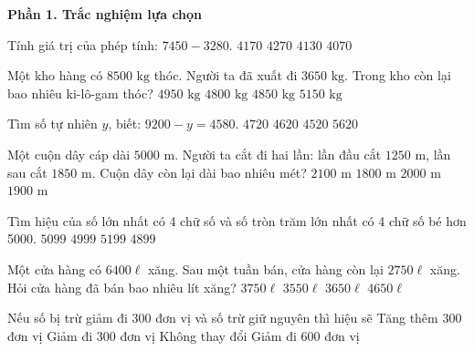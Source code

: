 \textbf{Phần 1. Trắc nghiệm lựa chọn}

\begin{ex} %
Tính giá trị của phép tính: $7450 - 3280$.
\choice
{\True $4170$}
{$4270$}
{$4130$}
{$4070$}
\end{ex}

\begin{ex} %
Một kho hàng có $8500\text{ kg}$ thóc. Người ta đã xuất đi $3650\text{ kg}$. Trong kho còn lại bao nhiêu ki-lô-gam thóc?
\choice
{$4950\text{ kg}$}
{$4800\text{ kg}$}
{\True $4850\text{ kg}$}
{$5150\text{ kg}$}
\end{ex}

\begin{ex} %
Tìm số tự nhiên $y$, biết: $9200 - y = 4580$.
\choice
{$4720$}
{\True $4620$}
{$4520$}
{$5620$}
\end{ex}

\begin{ex} %
Một cuộn dây cáp dài $5000\text{ m}$. Người ta cắt đi hai lần: lần đầu cắt $1250\text{ m}$, lần sau cắt $1850\text{ m}$. Cuộn dây còn lại dài bao nhiêu mét?
\choice
{$2100\text{ m}$}
{$1800\text{ m}$}
{$2000\text{ m}$}
{\True $1900\text{ m}$}
\end{ex}

\begin{ex} %
Tìm hiệu của số lớn nhất có 4 chữ số và số tròn trăm lớn nhất có 4 chữ số bé hơn 5000.
\choice
{\True $5099$}
{$4999$}
{$5199$}
{$4899$}
\end{ex}

\begin{ex} %
Một cửa hàng có $6400\ell$ xăng. Sau một tuần bán, cửa hàng còn lại $2750\ell$ xăng. Hỏi cửa hàng đã bán bao nhiêu lít xăng?
\choice
{$3750\ell$}
{$3550\ell$}
{\True $3650\ell$}
{$4650\ell$}
\end{ex}

\begin{ex} %
Nếu số bị trừ giảm đi 300 đơn vị và số trừ giữ nguyên thì hiệu sẽ
\choice
{Tăng thêm 300 đơn vị}
{\True Giảm đi 300 đơn vị}
{Không thay đổi}
{Giảm đi 600 đơn vị}
\end{ex}


